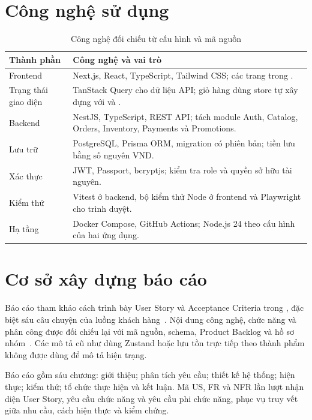 \section{Công nghệ sử dụng}
\begin{table}[H]
\centering\small
\caption{Công nghệ đối chiếu từ cấu hình và mã nguồn}
\label{tab:stack}
\begin{tabularx}{\textwidth}{@{}L{0.21\textwidth}Y@{}}
\toprule
\textbf{Thành phần} & \textbf{Công nghệ và vai trò} \\
\midrule
Frontend & Next.js, React, TypeScript, Tailwind CSS; các trang trong . \\
Trạng thái giao diện & TanStack Query cho dữ liệu API; giỏ hàng dùng store tự xây dựng với  và . \\
Backend & NestJS, TypeScript, REST API; tách module Auth, Catalog, Orders, Inventory, Payments và Promotions. \\
Lưu trữ & PostgreSQL, Prisma ORM, migration có phiên bản; tiền lưu bằng số nguyên VND. \\
Xác thực & JWT, Passport, bcryptjs; kiểm tra role và quyền sở hữu tài nguyên. \\
Kiểm thử & Vitest ở backend, bộ kiểm thử Node ở frontend và Playwright cho trình duyệt. \\
Hạ tầng & Docker Compose, GitHub Actions; Node.js 24 theo cấu hình của hai ứng dụng. \\
\bottomrule
\end{tabularx}
\end{table}

\section{Cơ sở xây dựng báo cáo}
Báo cáo tham khảo cách trình bày User Story và Acceptance Criteria trong
, đặc biệt sáu câu chuyện của luồng
khách hàng~\cite{reference-assignment}. Nội dung công nghệ, chức năng và
phân công được đối chiếu lại với mã nguồn, schema, Product Backlog và hồ
sơ nhóm~\cite{source-code,backlog,assignment}. Các mô tả cũ như dùng
Zustand hoặc lưu tồn trực tiếp theo thành phẩm không được dùng để mô tả
hiện trạng.

Báo cáo gồm sáu chương: giới thiệu; phân tích yêu cầu; thiết kế hệ thống;
hiện thực; kiểm thử; tổ chức thực hiện và kết luận. Mã US, FR và NFR lần
lượt nhận diện User Story, yêu cầu chức năng và yêu cầu phi chức năng,
phục vụ truy vết giữa nhu cầu, cách hiện thực và kiểm chứng.
